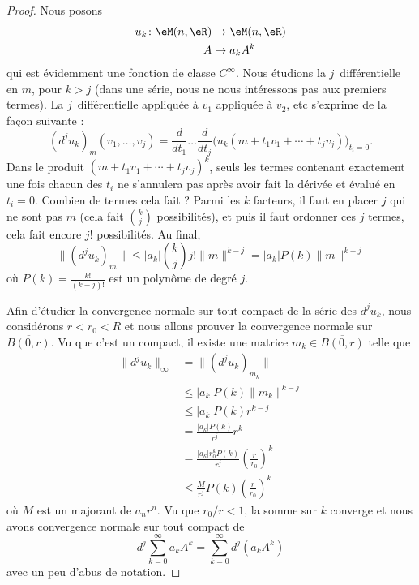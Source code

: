 \begin{proof}
    Nous posons 
    \begin{equation}
        \begin{aligned}
            u_k\colon \eM(n,\eR)&\to \eM(n,\eR) \\
            A&\mapsto a_kA^k 
        \end{aligned}
    \end{equation}
    qui est évidemment une fonction de classe \(  C^{\infty}\). Nous étudions la \( j\)\ieme\ différentielle en \( m\), pour \( k>j\) (dans une série, nous ne nous intéressons pas aux premiers termes). La \( j\)\ieme\ différentielle appliquée à \( v_1\) appliquée à \( v_2\), etc s'exprime de la façon suivante :
    \begin{equation}
        (d^ju_k)_m(v_1,\ldots, v_j)=\frac{ d  }{ d t_1 }\ldots\frac{ d  }{ d t_j }\Big( u_k(m+t_1v_1+\cdots +t_jv_j)    \Big)_{t_i=0}.
    \end{equation}
    Dans le produit \( (m+t_1v_1+\cdots +t_jv_j)^k\), seuls les termes contenant exactement une fois chacun des \( t_i\) ne s'annulera pas après avoir fait la dérivée et évalué en \( t_i=0\). Combien de termes cela fait ? Parmi les \( k\) facteurs, il faut en placer \( j\) qui ne sont pas \( m\) (cela fait \( \binom{ k }{ j }\) possibilités), et puis il faut ordonner ces \( j\) termes, cela fait encore \( j!\) possibilités. Au final,
    \begin{equation}
        \| (d^ju_k)_m \|\leq | a_k | \binom{ k }{ j }j!\| m \|^{k-j}=| a_k |P(k)\| m \|^{k-j}
    \end{equation}
    où \( P(k)=\frac{ k! }{ (k-j)! }\) est un polynôme de degré \( j\).

    Afin d'étudier la convergence normale sur tout compact de la série des \( d^ju_k\), nous considérons \( r<r_0<R\) et nous allons prouver la convergence normale sur \( \overline{ B(0,r) }\). Vu que c'est un compact, il existe une matrice \( m_k\in\overline{ B(0,r) }\) telle que
    \begin{subequations}
        \begin{align}
            \| d^ju_k \|_{\infty}&=\| (d^ju_k)_{m_k} \|\\
            &\leq | a_k |P(k)\| m_k \|^{k-j}\\
            &\leq | a_k |P(k)r^{k-j}\\
            &=\frac{ | a_k |P(k) }{ r^j }r^k\\
            &=\frac{ | a_k |r_0^kP(k) }{ r^j }\left( \frac{ r }{ r_0 } \right)^k\\
            &\leq \frac{ M }{ r^j }P(k)\left( \frac{ r }{ r_0 } \right)^k
        \end{align}
    \end{subequations}
    où \( M\) est un majorant de \( a_nr^n\). Vu que \( r_0/r<1\), la somme sur \( k\) converge et nous avons convergence normale sur tout compact de
    \begin{equation}
        d^j\sum_{k=0}^{\infty}a_kA^k=\sum_{k=0}^{\infty}d^j(a_kA^k)
    \end{equation}
    avec un peu d'abus de notation.
\end{proof}

